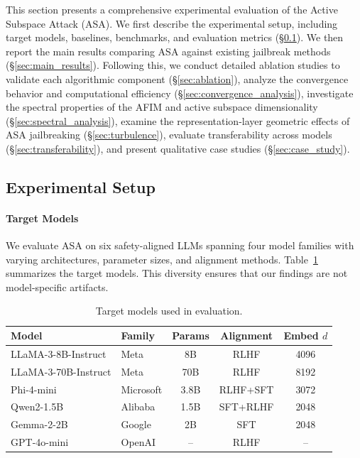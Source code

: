 ﻿\documentclass[lettersize,journal]{IEEEtran}
\begin{document}
This section presents a comprehensive experimental evaluation of the Active Subspace Attack (ASA). We first describe the experimental setup, including target models, baselines, benchmarks, and evaluation metrics (\S\ref{sec:exp_setup}). We then report the main results comparing ASA against existing jailbreak methods (\S\ref{sec:main_results}). Following this, we conduct detailed ablation studies to validate each algorithmic component (\S\ref{sec:ablation}), analyze the convergence behavior and computational efficiency (\S\ref{sec:convergence_analysis}), investigate the spectral properties of the AFIM and active subspace dimensionality (\S\ref{sec:spectral_analysis}), examine the representation-layer geometric effects of ASA jailbreaking (\S\ref{sec:turbulence}), evaluate transferability across models (\S\ref{sec:transferability}), and present qualitative case studies (\S\ref{sec:case_study}).

\subsection{Experimental Setup}
\label{sec:exp_setup}

\paragraph{Target Models} We evaluate ASA on six safety-aligned LLMs spanning four model families with varying architectures, parameter sizes, and alignment methods. Table~\ref{tab:models} summarizes the target models. This diversity ensures that our findings are not model-specific artifacts.

\begin{table}[t]
\centering
\caption{Target models used in evaluation.}
\label{tab:models}
\begin{tabular}{llccc}
\toprule
\textbf{Model} & \textbf{Family} & \textbf{Params} & \textbf{Alignment} & \textbf{Embed $d$} \\
\midrule
LLaMA-3-8B-Instruct & Meta & 8B & RLHF & 4096 \\
LLaMA-3-70B-Instruct & Meta & 70B & RLHF & 8192 \\
Phi-4-mini & Microsoft & 3.8B & RLHF+SFT & 3072 \\
Qwen2-1.5B & Alibaba & 1.5B & SFT+RLHF & 2048 \\
Gemma-2-2B & Google & 2B & SFT & 2048 \\
GPT-4o-mini & OpenAI & -- & RLHF & -- \\
\bottomrule
\end{tabular}
\end{table}
\end{document}
